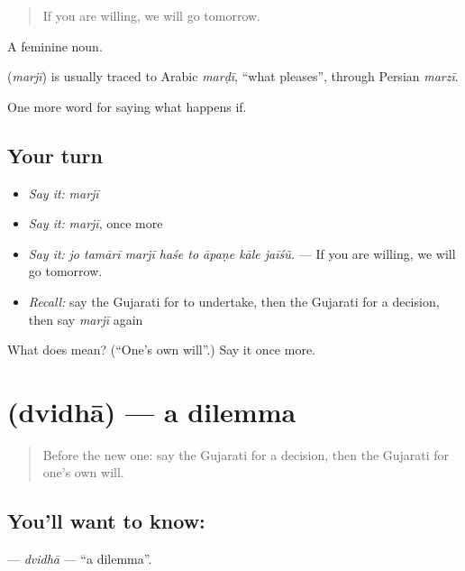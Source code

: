 \begin{quote}
If you are willing, we will go tomorrow.
\end{quote}

A feminine noun.

\begin{cousinweb}
\textbf{} (\emph{marjī}) is usually traced to Arabic \emph{marḍī}, \textquotedblleft{}what pleases\textquotedblright{}, through Persian \emph{marzī}.
\end{cousinweb}

\begin{grammarlens}[title={What you've built}]
One more word for saying what happens if.
\end{grammarlens}

\subsection*{Your turn}
\begin{itemize}
\raggedright
  \item \emph{Say it:} \emph{marjī}
  \item \emph{Say it:} \emph{marjī}, once more
  \item \emph{Say it:} \emph{jo tamārī marjī haśe to āpaṇe kāle jaīśũ.} — If you are willing, we will go tomorrow.
  \item \emph{Recall:} say the Gujarati for to undertake, then the Gujarati for a decision, then say \emph{marjī} again
\end{itemize}

\begin{tcolorbox}[breakable,colback=teal!4,colframe=teal!35!black,title={Before you move on}]
What does  mean? (\textquotedblleft{}One's own will\textquotedblright{}.) Say it once more.
\end{tcolorbox}
\section[\texorpdfstring{\gu{દ્વિધા} (dvidhā)}{દ્વિધા (dvidhā)}]{ (dvidhā) — a dilemma}

\label{lesson:GU-C389-dvidha}



\begin{quote}
Before the new one: say the Gujarati for a decision, then the Gujarati for one's own will.
\end{quote}

\subsection*{You'll want to know: }
\textbf{} — \emph{dvidhā} — \textquotedblleft{}a dilemma\textquotedblright{}.

